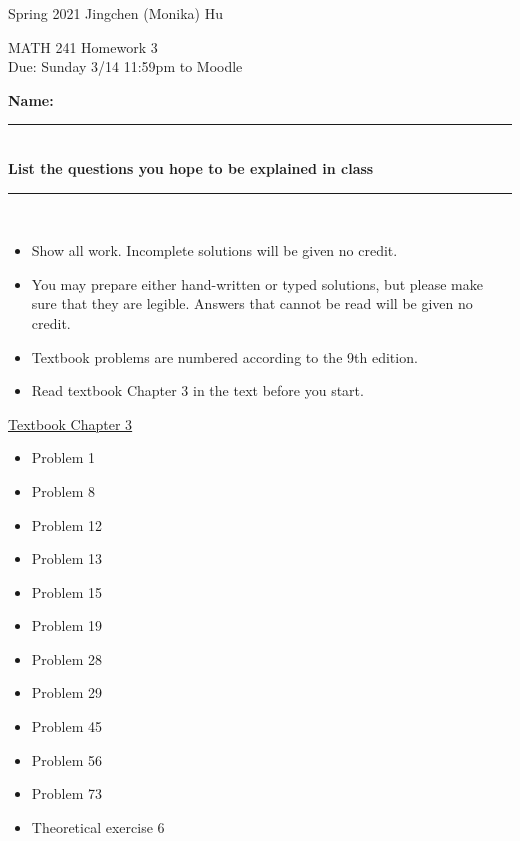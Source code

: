 \documentclass[11pt]{article}
\begin{document}
\enlargethispage{\baselineskip}

Spring 2021 \hfill Jingchen (Monika) Hu\\

\begin{center}
{\huge MATH 241 Homework 3}	\\
Due: Sunday 3/14 11:59pm to Moodle
\end{center}
\vspace{0.5cm}

\textbf{Name:} \rule{6cm}{0.5pt}\\
\textbf{List the questions you hope to be explained in class} \rule{3cm}{0.5pt}	 \\


{\bf
\begin{itemize}
\item Show all work. Incomplete solutions will be given no credit.
\item You may prepare either hand-written or typed solutions, but please make sure that they are legible.
Answers that cannot be read will be given no credit.
\item Textbook problems are numbered according to the 9th edition.
\item Read textbook Chapter 3 in the text before you start.

\end{itemize}
}

\underline{Textbook  Chapter 3   }

\begin{itemize}


    \item
    Problem 1
    \item
    Problem 8

    \item
    Problem  12

    \item
    Problem  13

    \item
    Problem  15

    \item
    Problem  19

    \item
    Problem  28

    \item
    Problem  29

    \item
    Problem  45

    \item
    Problem  56

    \item
    Problem  73


    \item
    Theoretical exercise 6



\end{itemize}
\end{document}
